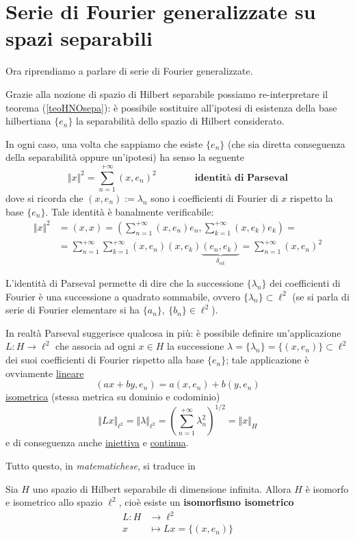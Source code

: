 \newpage

\section{Serie di Fourier generalizzate su spazi separabili}

Ora riprendiamo a parlare di serie di Fourier generalizzate.

Grazie alla nozione di spazio di Hilbert separabile possiamo re-interpretare il teorema (\ref{teoHNOsepa}): è possibile sostituire all'ipotesi di esistenza della base hilbertiana $\{e_n\}$ la separabilità dello spazio di Hilbert considerato.

In ogni caso, una volta che sappiamo che esiste $\{e_n\}$ (che sia diretta conseguenza della separabilità oppure un'ipotesi) ha senso la seguente
$$
\Vert x\Vert^2=\sum_{n=1}^{+\infty} (x,e_n)^2 \qquad\qquad  \textbf{identità di Parseval}
$$
dove si ricorda che $(x,e_n):=\lambda_n$ sono i coefficienti di Fourier di $x$ rispetto la base $\{e_n\}$. Tale identità è banalmente verificabile:
\begin{align*}
\Vert x \Vert^2&=(x,x)=\left(\sum_{n=1}^{+\infty}(x,e_n)e_n,\sum_{k=1}^{+\infty}(x,e_k)e_k\right)=\\
&=\sum_{n=1}^{+\infty}\sum_{k=1}^{+\infty} (x,e_n)(x,e_k)\underbrace{(e_n,e_k)}_{\delta_{nk}}=\sum_{n=1}^{+\infty} (x,e_n)^2
\end{align*}

L'identità di Parseval permette di dire che la successione $\{\lambda_n\}$ dei coefficienti di Fourier è una successione a quadrato sommabile, ovvero $\{\lambda_n\}\subset \ell^2$ (se si parla di serie di Fourier elementare si ha $\{a_n\},\ \{b_n\}\in\ell^2$).

In realtà Parseval suggerisce qualcosa in più: è possibile definire un'applicazione $L:H\to\ell^2$ che associa ad ogni $x\in H$ la successione $\lambda=\{\lambda_n\}=\{(x,e_n)\}\subset\ell^2$ dei suoi coefficienti di Fourier rispetto alla base $\{e_n\}$; tale applicazione è ovviamente \underline{lineare}
$$
(ax+by,e_n)=a(x,e_n)+b(y,e_n)
$$
\underline{isometrica} (stessa metrica su dominio e codominio)
$$
\Vert Lx \Vert_{\ell^2}=\Vert \lambda \Vert_{\ell^2}=\left(\sum_{n=1}^{+\infty}\lambda_n^2\right)^{1/2} =\Vert x \Vert_H
$$
e di conseguenza anche \underline{iniettiva} e \underline{continua}. 

Tutto questo, in \textit{matematichese}, si traduce in
\begin{thm}
Sia $H$ uno spazio di Hilbert separabile di dimensione infinita. Allora $H$ è isomorfo e isometrico allo spazio $\ell^2$, cioè esiste un \textbf{isomorfismo isometrico}
\begin{align*}
L:H&\to\ell^2 \\
x&\mapsto Lx=\{(x,e_n)\}
\end{align*}
\end{thm} 

